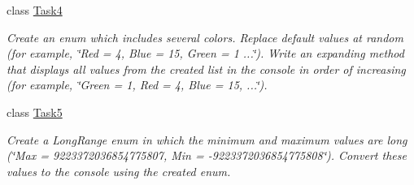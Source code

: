 \begin{DoxyCompactItemize}
class \mbox{\hyperlink{class_test_project_1_1_task_library_1_1_tasks_1_1_lesson2_1_1_task4}{Task4}}
\begin{DoxyCompactList}\small\item\em Create an enum which includes several colors. Replace default values at random (for example, \char`\"{}\+Red = 4, Blue = 15, Green = 1 ...\char`\"{}). Write an expanding method that displays all values from the created list in the console in order of increasing (for example, \char`\"{}\+Green = 1, Red = 4, Blue = 15, ...\char`\"{}). \end{DoxyCompactList}\item 
class \mbox{\hyperlink{class_test_project_1_1_task_library_1_1_tasks_1_1_lesson2_1_1_task5}{Task5}}
\begin{DoxyCompactList}\small\item\em Create a Long\+Range enum in which the minimum and maximum values are long (\char`\"{}\+Max = 9223372036854775807, Min = -\/9223372036854775808\char`\"{}). Convert these values to the console using the created enum. \end{DoxyCompactList}\end{DoxyCompactItemize}
